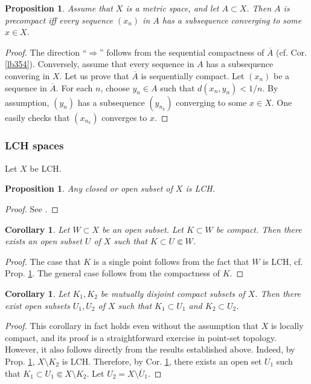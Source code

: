 \documentclass[12pt,b5paper,notitlepage]{article}
\theoremstyle{definition}
\theoremstyle{plain}
\newtheorem{pp}[df]{Proposition}
\newtheorem{co}[df]{Corollary}
\newcommand{\ovl}{\overline}
\numberwithin{equation}{section}
\begin{document}
\begin{pp}\label{lb180}
Assume that $X$ is a metric space, and let $A\subset X$. Then $A$ is precompact iff every sequence $(x_n)$ in $A$ has a subsequence converging to some $x\in X$. 
\end{pp}

\begin{proof}
The direction ``$\Rightarrow$'' follows from the sequential compactness of $\ovl A$ (cf. Cor. \ref{lb354}). Conversely, assume that every sequence in $A$ has a subsequence convering in $X$. Let us prove that $\ovl A$ is sequentially compact. Let $(x_n)$ be a sequence in $\ovl A$. For each $n$, choose $y_n\in A$ such that $d(x_n,y_n)<1/n$. By assumption, $(y_n)$ has a subsequence $(y_{n_k})$ converging to some $x\in X$. One easily checks that $(x_{n_k})$ converges to $x$.
\end{proof}




\subsubsection{LCH spaces}

Let $X$ be LCH.

\begin{pp}\label{lb3}
Any closed or open subset of $X$ is LCH.
\end{pp}

\begin{proof}
See \cite[Subsec. 8.6.2]{Gui-A}.
\end{proof}

\begin{co}\label{lb54}
Let $W\subset X$ be an open subset. Let $K\subset W$ be compact. Then there exists an open subset $U$ of $X$ such that $K\subset U\Subset W$. 
\end{co}
\begin{proof}
The case that $K$ is a single point follows from the fact that $W$ is LCH, cf. Prop. \ref{lb3}. The general case follows from the compactness of $K$.
\end{proof}

\begin{co}\label{lb102}
Let $K_1,K_2$ be mutually disjoint compact subsets of $X$. Then there exist open subsets $U_1,U_2$ of $X$ such that $K_1\subset U_1$ and $K_2\subset U_2$.
\end{co}

\begin{proof}
This corollary in fact holds even without the assumption that $X$ is locally compact, and its proof is a straightforward exercise in point-set topology. However, it also follows directly from the results established above. Indeed, by Prop. \ref{lb3}, $X\setminus K_2$ is LCH. Therefore, by Cor. \ref{lb54}, there exists an open set $U_1$ such that $K_1\subset U_1\Subset X\setminus K_2$. Let $U_2=X\setminus\ovl U_1$.
\end{proof}
\end{document}
